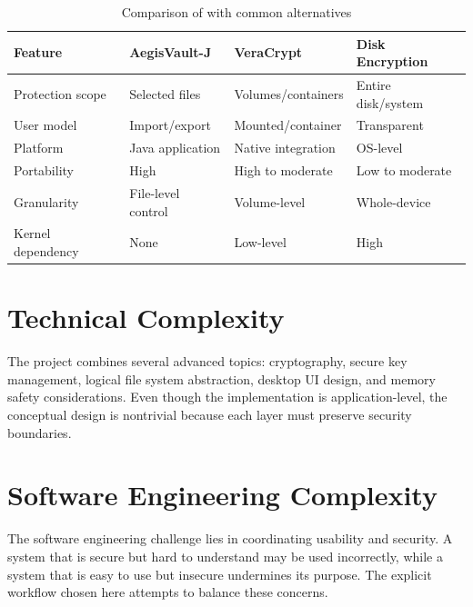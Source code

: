 \begin{table}[h]
\centering
\caption{Comparison of \projname{} with common alternatives}
\begingroup
\renewcommand{\arraystretch}{1.3}
\begin{tabular}{l l l l}
\hline
\rowcolor[HTML]{67FD9A}
{\bfseries Feature} & {\bfseries AegisVault-J} & {\bfseries VeraCrypt} & {\bfseries Disk Encryption} \\
\hline
\rowcolor[HTML]{EFEFEF}
Protection scope & Selected files & Volumes/containers & Entire disk/system \\
\hline
User model & Import/export & Mounted/container & Transparent \\
\hline
\rowcolor[HTML]{EFEFEF}
Platform & Java application & Native integration & OS-level \\
\hline
Portability & High & High to moderate & Low to moderate \\
\hline
\rowcolor[HTML]{EFEFEF}
Granularity & File-level control & Volume-level & Whole-device \\
\hline
Kernel dependency & None & Low-level & High \\
\hline
\end{tabular}
\endgroup
\label{tab:comparison}
\end{table}

\section{Technical Complexity}
The project combines several advanced topics: cryptography, secure key management, logical file system abstraction, desktop UI design, and memory safety considerations. Even though the implementation is application-level, the conceptual design is nontrivial because each layer must preserve security boundaries.

\section{Software Engineering Complexity}
The software engineering challenge lies in coordinating usability and security. A system that is secure but hard to understand may be used incorrectly, while a system that is easy to use but insecure undermines its purpose. The explicit workflow chosen here attempts to balance these concerns.

